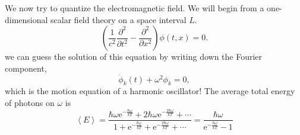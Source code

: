 We now try to quantize the electromagnetic field. We will begin from a one-dimensional scalar field theory on a space interval $L$.
\begin{equation}
  \left( \frac{1}{c^{2}} \frac{\partial^2 }{\partial t^2} - \frac{\partial^2 }{\partial x^2} \right) \phi (t,x)= 0.
\end{equation}
we can guess the solution of this equation by writing down the Fourier component, 
\begin{equation}
  \ddot{\phi}_{k}(t) + \omega^{2} \phi_{k} = 0,
\end{equation}
which is the motion equation of a harmonic oscillator!
The average total energy of photons on $\omega$ is
\begin{equation}
  \left< E \right> = \frac{\hbar\omega\mathrm{e}^{- \frac{\hbar\omega}{kT}}+ 2\hbar \omega \mathrm{e}^{- \frac{2\hbar\omega}{kT}}+ \cdots }{1 + \mathrm{e}^{- \frac{\hbar\omega}{kT}}+\mathrm{e}^{-\frac{2\hbar\omega}{kT}}+ \cdots } = \frac{\hbar \omega}{\mathrm{e}^{- \frac{\hbar\omega}{kT}}-1}
\end{equation} 